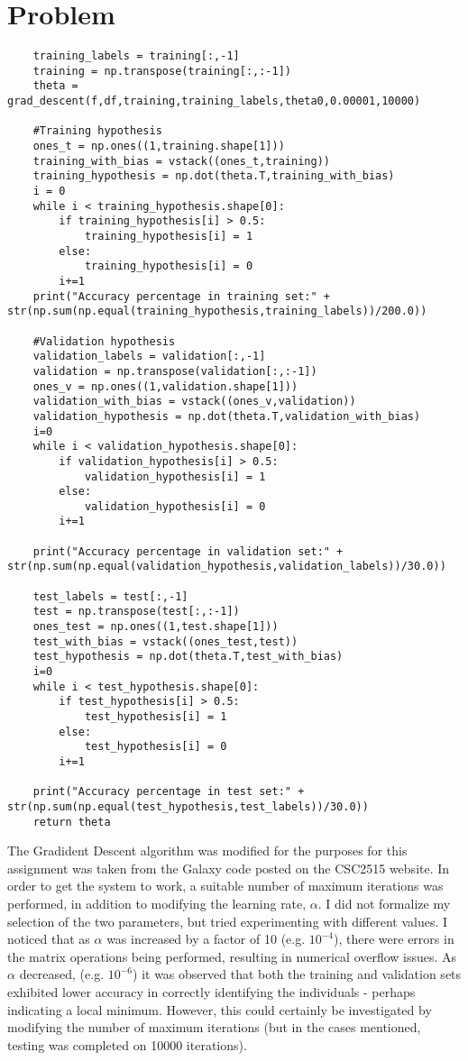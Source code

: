 \documentclass{article}
\newcommand{\enterProblemHeader}[1]{
}
\newcommand{\exitProblemHeader}[1]{
}
\newcounter{homeworkProblemCounter} %
\newcommand{\homeworkProblemName}{}
\newenvironment{homeworkProblem}[1][Problem \arabic{homeworkProblemCounter}]{ %
\stepcounter{homeworkProblemCounter} %
\renewcommand{\homeworkProblemName}{#1} %
\section{\homeworkProblemName} %
\enterProblemHeader{\homeworkProblemName} %
}{
\exitProblemHeader{\homeworkProblemName} %
}
\begin{document}
\begin{homeworkProblem}
\begin{lstlisting}
    training_labels = training[:,-1]
    training = np.transpose(training[:,:-1])
    theta = grad_descent(f,df,training,training_labels,theta0,0.00001,10000)

    #Training hypothesis
    ones_t = np.ones((1,training.shape[1]))
    training_with_bias = vstack((ones_t,training))
    training_hypothesis = np.dot(theta.T,training_with_bias)
    i = 0
    while i < training_hypothesis.shape[0]:
        if training_hypothesis[i] > 0.5:
            training_hypothesis[i] = 1
        else:
            training_hypothesis[i] = 0
        i+=1
    print("Accuracy percentage in training set:" + str(np.sum(np.equal(training_hypothesis,training_labels))/200.0))

    #Validation hypothesis
    validation_labels = validation[:,-1]
    validation = np.transpose(validation[:,:-1])
    ones_v = np.ones((1,validation.shape[1]))
    validation_with_bias = vstack((ones_v,validation))
    validation_hypothesis = np.dot(theta.T,validation_with_bias)
    i=0
    while i < validation_hypothesis.shape[0]:
        if validation_hypothesis[i] > 0.5:
            validation_hypothesis[i] = 1
        else:
            validation_hypothesis[i] = 0
        i+=1

    print("Accuracy percentage in validation set:" + str(np.sum(np.equal(validation_hypothesis,validation_labels))/30.0))

    test_labels = test[:,-1]
    test = np.transpose(test[:,:-1])
    ones_test = np.ones((1,test.shape[1]))
    test_with_bias = vstack((ones_test,test))
    test_hypothesis = np.dot(theta.T,test_with_bias)
    i=0
    while i < test_hypothesis.shape[0]:
        if test_hypothesis[i] > 0.5:
            test_hypothesis[i] = 1
        else:
            test_hypothesis[i] = 0
        i+=1

    print("Accuracy percentage in test set:" + str(np.sum(np.equal(test_hypothesis,test_labels))/30.0))
    return theta
\end{lstlisting}

The Gradident Descent algorithm was modified for the purposes for this assignment was taken from the Galaxy code posted on the CSC2515 website.  In order to get the system to work, a suitable number of maximum iterations was performed, in addition to modifying the learning rate, $\alpha$.  I did not formalize my selection of the two parameters, but tried experimenting with different values.  I noticed that as $\alpha$ was increased by a factor of 10 (e.g. $10^{-4}$), there were errors in the matrix operations being performed, resulting in numerical overflow issues.  As $\alpha$ decreased, (e.g. $10^{-6}$) it was observed that both the training and validation sets exhibited lower accuracy in correctly identifying the individuals - perhaps indicating a local minimum.  However, this could certainly be investigated by modifying the number of maximum iterations (but in the cases mentioned, testing was completed on 10000 iterations).


\end{homeworkProblem}
\end{document}
